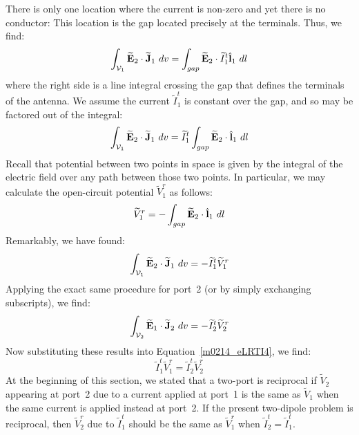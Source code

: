 There is only one location where the current is non-zero and yet there is no conductor: 
This location is the gap located precisely at the terminals.
Thus, we find:
%
\begin{equation}
\int_{{\mathcal V}_1} { \widetilde{\bf E}_2 \cdot \widetilde{\bf J}_1 ~dv} 
= \int_{gap} { \widetilde{\bf E}_2 \cdot \widetilde{I}_1^t \hat{\bf l}_1  ~dl }
\end{equation}
%
where the right side is a line integral crossing the gap that defines the terminals of the antenna.
We assume the current $\widetilde{I}_1^t$ is constant over the gap, and so may be factored out of the integral:
%
\begin{equation}
\int_{{\mathcal V}_1} { \widetilde{\bf E}_2 \cdot \widetilde{\bf J}_1 ~dv} 
= \widetilde{I}_1^t \int_{gap} { \widetilde{\bf E}_2 \cdot \hat{\bf l}_1 ~dl }
\end{equation}
%
Recall that potential between two points in space is given by the integral of the electric field over any path between those two points.
In particular, we may calculate the open-circuit potential $\widetilde{V}_1^r$ as follows:
%
\begin{equation}
\widetilde{V}_1^r = -\int_{gap} { \widetilde{\bf E}_2 \cdot \hat{\bf l}_1 ~dl }
\end{equation}
%
Remarkably, we have found:
%
\begin{equation}
\int_{{\mathcal V}_1} { \widetilde{\bf E}_2 \cdot \widetilde{\bf J}_1 ~dv} 
= -\widetilde{I}_1^t \widetilde{V}_1^r
\end{equation}
%
Applying the exact same procedure for port~2 (or by simply exchanging subscripts), we find:
%
\begin{equation}
\int_{{\mathcal V}_2} { \widetilde{\bf E}_1 \cdot \widetilde{\bf J}_2 ~dv} 
= -\widetilde{I}_2^t \widetilde{V}_2^r
\end{equation}
% 
Now substituting these results into Equation~\ref{m0214_eLRTI4}, we find:
%
\begin{equation}
\boxed{
\widetilde{I}_1^t \widetilde{V}_1^r = \widetilde{I}_2^t \widetilde{V}_2^r
}
\label{m0214_eRIV}
\end{equation}
%
At the beginning of this section, we stated that a two-port is reciprocal if $\widetilde{V}_2$ appearing at port~2 due to a current applied at port~1 is the same as $\widetilde{V}_1$ when the same current is applied instead at port~2.
If the present two-dipole problem is reciprocal, then $\widetilde{V}_2^r$ due to $\widetilde{I}_1^t$ should be the same as $\widetilde{V}_1^r$ when $\widetilde{I}_2^t=\widetilde{I}_1^t$.  
